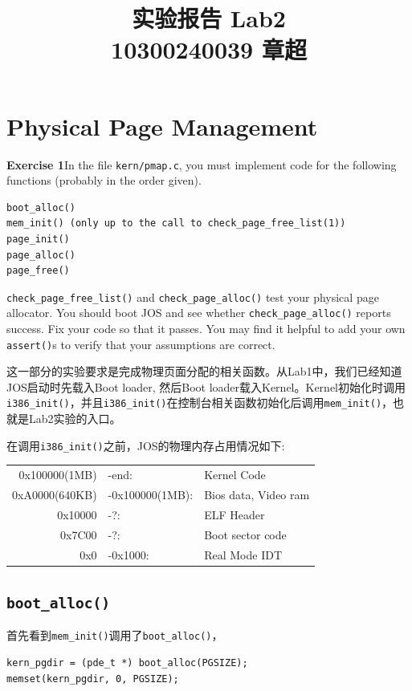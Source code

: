 \documentclass[11pt]{article}
\begin{document}
\title{\textbf{\huge{实验报告 Lab2}}\\
10300240039 章超}
\maketitle
\section{Physical Page Management}
\begin{framed}
\noindent\textbf{Exercise 1}In the file \lstinline|kern/pmap.c|, you must implement code for the following functions (probably in the order given).

\begin{lstlisting}[frame=none,aboveskip=-1.5em]
boot_alloc()
mem_init() (only up to the call to check_page_free_list(1))
page_init()
page_alloc()
page_free()
\end{lstlisting}

\lstinline|check_page_free_list()| and \lstinline|check_page_alloc()| test your physical page allocator. You should boot JOS and see whether \lstinline|check_page_alloc()| reports success. Fix your code so that it passes. You may find it helpful to add your own \lstinline|assert()|s to verify that your assumptions are correct.
\end{framed}
这一部分的实验要求是完成物理页面分配的相关函数。从Lab1中，我们已经知道JOS启动时先载入Boot loader, 然后Boot loader载入Kernel。Kernel初始化时调用\lstinline|i386_init()|，并且\lstinline|i386_init()|在控制台相关函数初始化后调用\lstinline|mem_init()|，也就是Lab2实验的入口。

在调用\lstinline|i386_init()|之前，JOS的物理内存占用情况如下:

\begin{tabular}{rll}
0x100000(1MB) & -end: & Kernel Code\\
0xA0000(640KB) & -0x100000(1MB): & Bios data, Video ram\\
0x10000 & -?: & ELF Header\\
0x7C00 & -?: & Boot sector code\\
0x0 & -0x1000: & Real Mode IDT
\end{tabular}

\subsection{\lstinline|boot_alloc()|}

首先看到\lstinline|mem_init()|调用了\lstinline|boot_alloc()|，
\begin{lstlisting}[title=kern/pmap.c]
kern_pgdir = (pde_t *) boot_alloc(PGSIZE);
memset(kern_pgdir, 0, PGSIZE);
\end{lstlisting}
\end{document}
